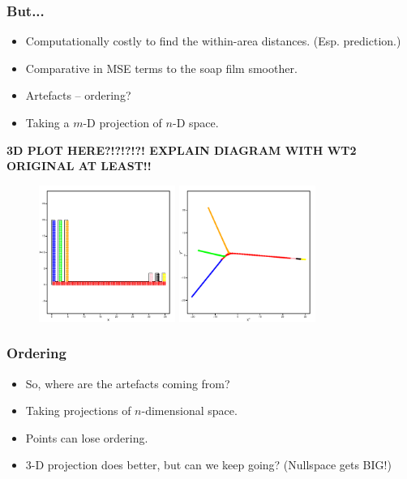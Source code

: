 \documentclass[ignorenonframetext]{beamer} %
\newcommand{\bi}{\begin{itemize}}
\newcommand{\ei}{\end{itemize}}
\begin{document}
\begin{frame}
	\frametitle{But...}
          \bi
            \item Computationally costly to find the within-area distances. (Esp. prediction.)
            \item Comparative in MSE terms to the soap film smoother.
            \item Artefacts -- ordering?
            \item Taking a $m$-D projection of $n$-D space.
           \ei
\textbf{3D PLOT HERE?!?!?!?! EXPLAIN DIAGRAM WITH WT2 ORIGINAL AT LEAST!!}
	\begin{figure}
	         	\centering
              \includegraphics[height=1.75in]{figs/comb.pdf} \includegraphics[height=1.75in]{figs/comb-2d.pdf}
	\end{figure}
\end{frame}



\begin{frame}
	\frametitle{Ordering}
	\bi
		\item So, where are the artefacts coming from?
		\item Taking projections of $n$-dimensional space.
		\item Points can lose ordering.
		\item 3-D projection does better, but can we keep going? (Nullspace gets BIG!)
	\ei
\end{frame}

\end{document}
